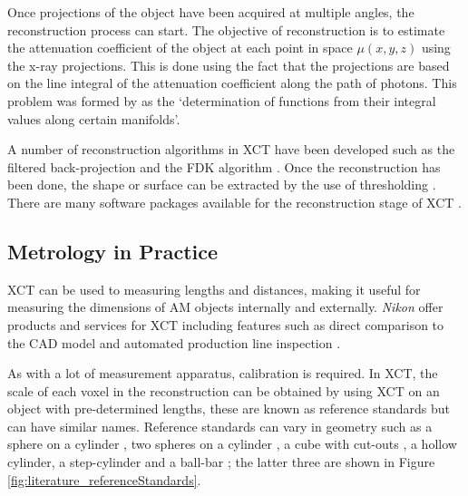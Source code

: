 Once projections of the object have been acquired at multiple angles, the reconstruction process can start. The objective of reconstruction is to estimate the attenuation coefficient of the object at each point in space $\mu(x,y,z)$ using the x-ray projections. This is done using the fact that the projections are based on the line integral of the attenuation coefficient along the path of photons. This problem was formed by \cite{radon1986on} as the `determination of functions from their integral values along certain manifolds'.

A number of reconstruction algorithms in XCT have been developed \citep{smith1990cone} such as the filtered back-projection \citep{brooks1976principles} and the FDK algorithm \citep{feldkamp1984practical}. Once the reconstruction has been done, the shape or surface can be extracted by the use of thresholding \citep{kruth2011computed}. There are many software packages available for the reconstruction stage of XCT \citep{reinhart2008industrial, sun2012overview}.

\subsection{Metrology in Practice}

XCT can be used to measuring lengths and distances, making it useful for measuring the dimensions of AM objects internally and externally. \emph{Nikon} offer products and services for XCT including features such as direct comparison to the CAD model \citep{nikon2015microfocus, nikon2018mct225} and automated production line inspection \citep{nikon2015inline, nikon2018automated}.

As with a lot of measurement apparatus, calibration is required. In XCT, the scale of each voxel in the reconstruction can be obtained by using XCT on an object with pre-determined lengths, these are known as reference standards \citep{bartscher2007enhancement} but can have similar names. Reference standards can vary in geometry such as a sphere on a cylinder \citep{lifton2013application}, two spheres on a cylinder \citep{sun2016reference}, a cube with cut-outs \citep{kiekens2011test}, a hollow cylinder, a step-cylinder and a ball-bar \citep{bartscher2007enhancement}; the latter three are shown in Figure \ref{fig:literature_referenceStandards}.

